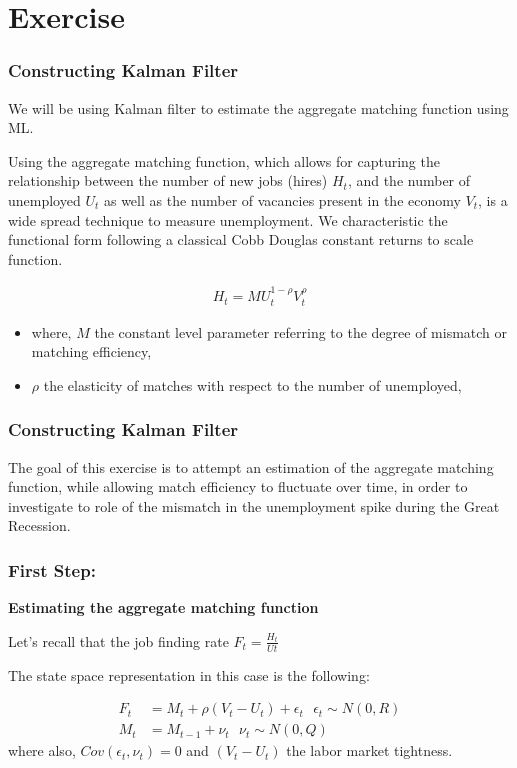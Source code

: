 \documentclass[notes=show]{beamer}%
\makeatletter
\let\beamer@writeslidentry@miniframeson=\beamer@writeslidentry
\def\beamer@writeslidentry@miniframesoff{  \expandafter\beamer@ifempty\expandafter{\beamer@framestartpage}{}  {        \clearpage\beamer@notesactions  }
}
\newcommand*{\miniframeson}
{\let\beamer@writeslidentry=\beamer@writeslidentry@miniframeson}
\newcommand*{\miniframesoff}
{\let\beamer@writeslidentry=\beamer@writeslidentry@miniframesoff}
\makeatother
\begin{document}
\miniframesoff
\section{Exercise}

\miniframeson

\begin{frame}

\frametitle{Constructing Kalman Filter}

We will be using Kalman filter to estimate the aggregate matching function using ML.\\
\bigskip

Using the aggregate matching function, which allows for capturing the relationship between the number of new jobs (hires) $H_{t}$, and the number of unemployed $U_{t}$ as well as the number of vacancies present in the economy $V_{t}$, is a wide spread technique to measure unemployment. We characteristic the functional form following a classical Cobb Douglas constant returns to scale function.

\begin{align}
H_{t} = M U_{t}^{1-\rho}V_{t}^{\rho}
\end{align}
\begin{itemize}

\item where, $M$ the constant level parameter referring to the degree of mismatch or matching efficiency,
\item $\rho$ the elasticity of matches with respect to the number of unemployed,
\end{itemize}

\end{frame}


\begin{frame}

\frametitle{Constructing Kalman Filter}

The goal of this exercise is to attempt an estimation of the aggregate matching function, while allowing match efficiency to 
fluctuate over time, in order to investigate to role of the mismatch in the unemployment spike
during the Great Recession. 

\end{frame}


\begin{frame}

\frametitle{First Step:}
\textbf{Estimating the aggregate matching function} \\
\bigskip

Let's recall that the job finding rate $F_{t}=\frac{H_{t}}{U{t}}$\\
\bigskip

The state space representation in this case is the following:

\begin{align}
F_{t} &= M_{t} + \rho (V_{t}-U_{t})+\epsilon_{t} \text{     } \epsilon_{t} \sim N(0,R) \\
M_{t}&=M_{t-1}+\nu_{t} \text{     } \nu_{t} \sim N(0,Q)
\end{align}
where also, $Cov(\epsilon_{t},\nu_{t})=0$ and $(V_{t}-U_{t})$ the labor market tightness.

\end{frame}
\end{document}
